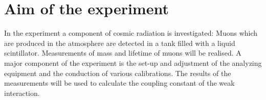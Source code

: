 \section{Aim of the experiment}

In the experiment a component of cosmic radiation is investigated:
Muons which are produced in the atmosphere are detected in a tank filled with a liquid scintillator.
Measurements of mass and lifetime of muons will be realised.
A major component of the experiment is the set-up and adjustment of the analyzing equipment
and the conduction of various calibrations.
The results of the measurements will be used to calculate the coupling constant of the weak interaction.